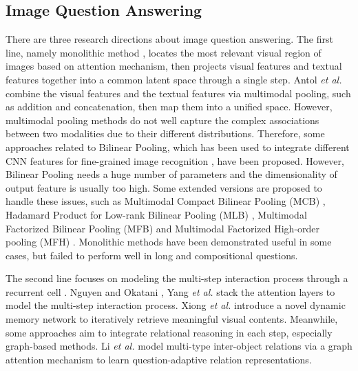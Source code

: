 \documentclass[journal]{IEEEtran}
\begin{document}
\subsection{Image Question Answering}
There are three research directions about image question answering. The first line, namely monolithic method \cite{li2019perceptual, nie2012beyond}, locates the most relevant visual region of images based on attention mechanism, then projects visual features and textual features together into a common latent space through a single step. Antol \textit{et al.} \cite{antol2015vqa} combine the visual features and the textual features via multimodal pooling, such as addition and concatenation, then map them into a unified space. However, multimodal pooling methods do not well capture the complex associations between two modalities due to their different distributions. Therefore, some approaches \cite{tenenbaum2000separating} related to Bilinear Pooling, which has been used to integrate different CNN features for fine-grained image recognition \cite{lin2015bilinear}, have been proposed. However, Bilinear Pooling needs a huge number of parameters and the dimensionality of output feature is usually too high. Some extended versions are proposed to handle these issues, such as Multimodal Compact Bilinear Pooling (MCB) \cite{fukui2016multimodal}, Hadamard Product for Low-rank Bilinear Pooling (MLB) \cite{kim2016hadamard}, Multimodal Factorized Bilinear Pooling (MFB) \cite{yu2017multi} and Multimodal Factorized High-order pooling (MFH) \cite{yu2018beyond}. Monolithic methods have been demonstrated useful in some cases, but failed to perform well in long and compositional questions.

The second line focuses on modeling the multi-step interaction process through a recurrent cell \cite{yang2016stacked, nguyen2018improved, yu2019deep, xiong2016dynamic,nie2019multimodal}. Nguyen and Okatani \cite{yang2016stacked}, Yang \textit{et al.} \cite{nguyen2018improved} stack the attention layers to model the multi-step interaction process. Xiong \textit{et al.} \cite{xiong2016dynamic} introduce a novel dynamic memory network to iteratively retrieve meaningful visual contents. Meanwhile, some approaches \cite{teney2017graph, li2019relation, hu2019language} aim to integrate relational reasoning in each step, especially graph-based methods. Li \textit{et al.} \cite{li2019relation} model multi-type inter-object relations via a graph attention mechanism to learn question-adaptive relation representations.
\end{document}
